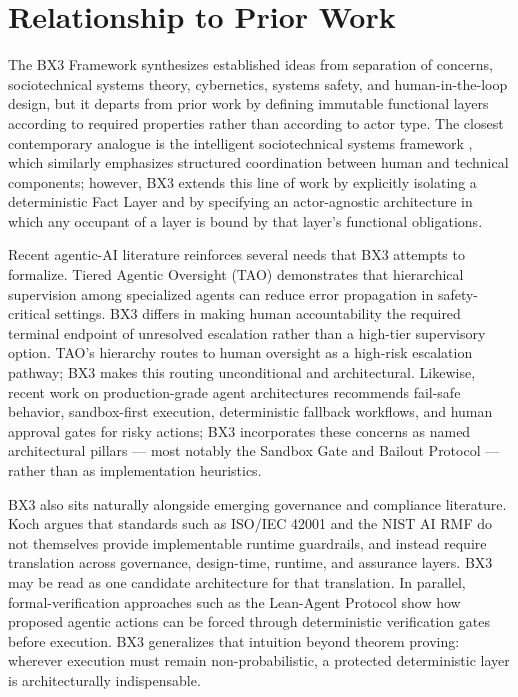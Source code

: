 \documentclass[12pt]{article}
\begin{document}
\section{Relationship to Prior Work}
\label{sec:prior}

The BX3 Framework synthesizes established ideas from separation of concerns, sociotechnical systems theory, cybernetics, systems safety, and human-in-the-loop design, but it departs from prior work by defining immutable functional layers according to required properties rather than according to actor type. The closest contemporary analogue is the intelligent sociotechnical systems framework \cite{xu2024}, which similarly emphasizes structured coordination between human and technical components; however, BX3 extends this line of work by explicitly isolating a deterministic Fact Layer and by specifying an actor-agnostic architecture in which any occupant of a layer is bound by that layer's functional obligations.

Recent agentic-AI literature reinforces several needs that BX3 attempts to formalize. Tiered Agentic Oversight (TAO) \cite{kim2025} demonstrates that hierarchical supervision among specialized agents can reduce error propagation in safety-critical settings. BX3 differs in making human accountability the required terminal endpoint of unresolved escalation rather than a high-tier supervisory option. TAO's hierarchy routes to human oversight as a high-risk escalation pathway; BX3 makes this routing unconditional and architectural. Likewise, recent work on production-grade agent architectures \cite{alenezi2026} recommends fail-safe behavior, sandbox-first execution, deterministic fallback workflows, and human approval gates for risky actions; BX3 incorporates these concerns as named architectural pillars --- most notably the Sandbox Gate and Bailout Protocol --- rather than as implementation heuristics.

BX3 also sits naturally alongside emerging governance and compliance literature. Koch \cite{koch2026} argues that standards such as ISO/IEC 42001 \cite{iso2023} and the NIST AI RMF \cite{nist2023} do not themselves provide implementable runtime guardrails, and instead require translation across governance, design-time, runtime, and assurance layers. BX3 may be read as one candidate architecture for that translation. In parallel, formal-verification approaches such as the Lean-Agent Protocol \cite{rashie2026} show how proposed agentic actions can be forced through deterministic verification gates before execution. BX3 generalizes that intuition beyond theorem proving: wherever execution must remain non-probabilistic, a protected deterministic layer is architecturally indispensable.
\end{document}
